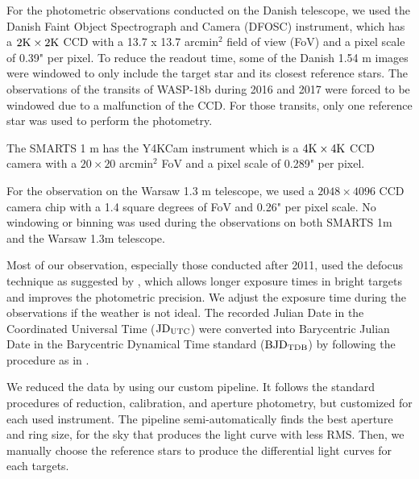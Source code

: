For the photometric observations conducted on the Danish telescope, we used the Danish Faint Object Spectrograph and Camera (DFOSC) instrument, which has a $2{\rm K} \times 2{\rm K}$ CCD with a 13.7 x 13.7 arcmin$^2$ field of view (FoV) and a pixel scale of 0.39" per pixel. To reduce the readout time, some of the Danish 1.54 m images were windowed to only include the target star and its closest reference stars. The observations of the transits of WASP-18b during 2016 and 2017 were forced to be windowed due to a malfunction of the CCD. For those transits, only one reference star was used to perform the photometry.

The SMARTS 1 m has the Y4KCam instrument which is a $4{\rm K} \times 4{\rm K}$ CCD camera with a $20\times20$ arcmin$^2$ FoV and a pixel scale of 0.289" per pixel. 

For the observation on the Warsaw 1.3 m telescope, we used a $2048 \times 4096$ CCD camera chip with a 1.4 square degrees of FoV and 0.26" per pixel scale. No windowing or binning was used during the observations on both SMARTS 1m and the Warsaw 1.3m telescope.

Most of our observation, especially those conducted after 2011, used the defocus technique as suggested by \cite{Southworth2009},  which allows longer exposure times in bright targets and improves the photometric precision. We adjust the exposure time during the observations if the weather is not ideal. The recorded Julian Date in the Coordinated Universal Time (${\rm JD_{UTC}}$) were converted into Barycentric Julian Date in the Barycentric Dynamical Time standard (${\rm BJD_{TDB}}$) by following the procedure as in \citet{Eastman2010}.

We reduced the data by using our custom pipeline. It follows the standard procedures of reduction, calibration, and aperture photometry, but customized for each used instrument. The pipeline semi-automatically finds the best aperture and ring size, for the sky that produces the light curve with less RMS. Then, we manually choose the reference stars to produce the differential light curves for each targets.


